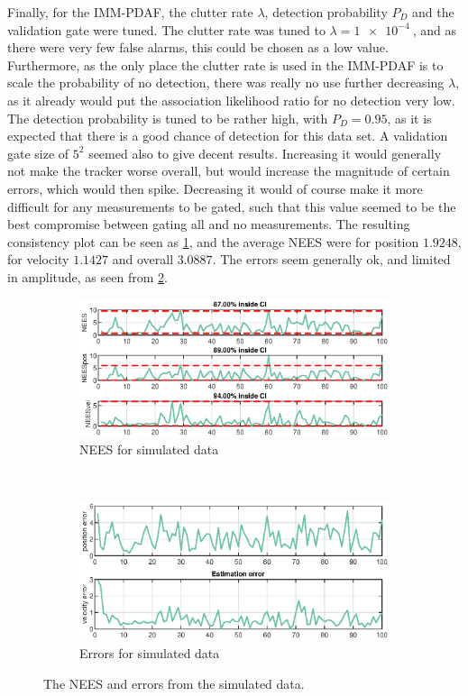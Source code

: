 Finally, for the IMM-PDAF, the clutter rate $\lambda$, detection probability $P_D$ and the validation gate were tuned. The clutter rate was tuned to $\lambda = \SI{1e-4}{}$, and as there were very few false alarms, this could be chosen as a low value. Furthermore, as the only place the clutter rate is used in the IMM-PDAF is to scale the probability of no detection, there was really no use further decreasing $\lambda$, as it already would put the association likelihood ratio for no detection very low. The detection probability is tuned to be rather high, with $P_D = 0.95$, as it is expected that there is a good chance of detection for this data set. A validation gate size of $5^2$ seemed also to give decent results. Increasing it would generally not make the tracker worse overall, but would increase the magnitude of certain errors, which would then spike. Decreasing it would of course make it more difficult for any measurements to be gated, such that this value seemed to be the best compromise between gating all and no measurements. The resulting consistency plot can be seen as \cref{fig:ga_1_2_NEES}, and the average NEES were for position $1.9248$, for velocity $1.1427$ and overall $3.0887$. The errors seem generally ok, and limited in amplitude, as seen from \cref{fig:ga_1_2_error}. 

\begin{figure}[ht]
    \centering
	\begin{subfigure}[h]{0.4\textwidth}
		\includegraphics[width=\textwidth]{figures/ga_1/2_NEES}
		\caption{NEES for simulated data}
		\label{fig:ga_1_2_NEES}
    \end{subfigure}%
    ~
    \begin{subfigure}[h]{0.4\textwidth}
        \includegraphics[width=\textwidth]{figures/ga_1/2_error}
        \caption{Errors for simulated data}
        \label{fig:ga_1_2_error}
    \end{subfigure}
    \caption{The NEES and errors from the simulated data. }
    \label{fig:ga_1_2_NEES_and_error} 
\end{figure}

